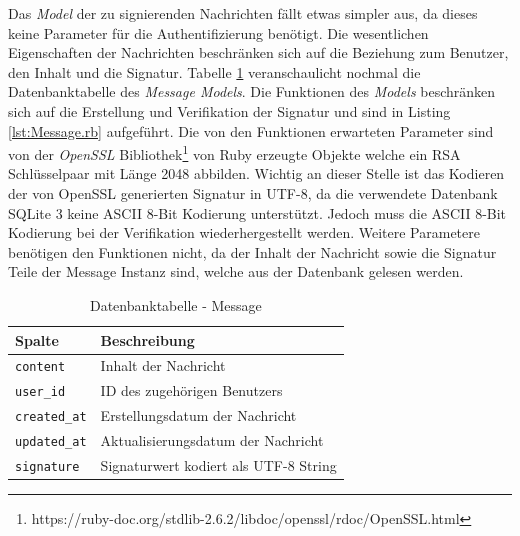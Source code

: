 \documentclass[11pt,a4paper,ngerman]{scrreprt}
\begin{document}
Das \textit{Model} der zu signierenden Nachrichten fällt etwas simpler aus, da dieses keine Parameter für die Authentifizierung benötigt. Die wesentlichen Eigenschaften der Nachrichten beschränken sich auf die Beziehung zum Benutzer, den Inhalt und die Signatur. Tabelle \ref{table:db-message} veranschaulicht nochmal die Datenbanktabelle des \textit{Message Models}. Die Funktionen des \textit{Models} beschränken sich auf die Erstellung und Verifikation der Signatur und sind in Listing \ref{lst:Message.rb} aufgeführt. Die von den Funktionen erwarteten Parameter sind von der \textit{OpenSSL} Bibliothek\footnote{https://ruby-doc.org/stdlib-2.6.2/libdoc/openssl/rdoc/OpenSSL.html} von Ruby erzeugte Objekte welche ein RSA Schlüsselpaar mit Länge 2048 abbilden. Wichtig an dieser Stelle ist das Kodieren der von OpenSSL generierten Signatur in UTF-8, da die verwendete Datenbank SQLite 3 keine ASCII 8-Bit Kodierung unterstützt. Jedoch muss die ASCII 8-Bit Kodierung bei der Verifikation wiederhergestellt werden. Weitere Parametere benötigen den Funktionen nicht, da der Inhalt der Nachricht sowie die Signatur Teile der Message Instanz sind, welche aus der Datenbank gelesen werden.
\begin{table}[htbp]
    \begin{tabularx}{\textwidth}{ lX }
        \toprule
        Spalte & Beschreibung \\ 
        \midrule
        \texttt{content} & Inhalt der Nachricht \\
        \texttt{user\_id} & ID des zugehörigen Benutzers \\
        \texttt{created\_at} & Erstellungsdatum der Nachricht \\
        \texttt{updated\_at} & Aktualisierungsdatum der Nachricht \\
        \texttt{signature} & Signaturwert kodiert als UTF-8 String \\
        \bottomrule
    \end{tabularx}
    \caption{Datenbanktabelle - Message}
    \label{table:db-message}
\end{table}
\end{document}
